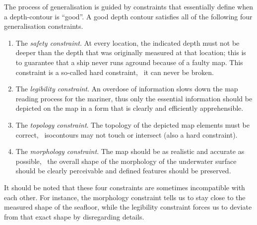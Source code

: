 The process of generalisation is guided by constraints that essentially define when a depth-contour is ``good''.
A good depth contour satisfies all of the following four generalisation constraints.
\begin{enumerate}
  \item The \emph{safety constraint}.  
  At every location, the indicated depth must not be deeper than the depth that was originally measured at that location; this is to guarantee that a ship never runs aground because of a faulty map.
  This constraint is a so-called hard constraint, \ie\ it can never be broken.
  \item The \emph{legibility constraint}. 
  An overdose of information slows down the map reading process for the mariner, thus only the essential information should be depicted on the map in a form that is clearly and efficiently apprehensible. %
  \item The \emph{topology constraint}. 
  The topology of the depicted map elements must be correct, \ie\ isocontours may not touch or intersect (also a hard constraint).
  \item The \emph{morphology constraint}. 
  The map should be as realistic and accurate as possible, \ie\ the overall shape of the morphology of the underwater surface should be clearly perceivable and defined features should be preserved.
\end{enumerate}

It should be noted that these four constraints are sometimes incompatible with each other. 
For instance, the morphology constraint tells us to stay close to the measured shape of the seafloor, while the legibility constraint forces us to deviate from that exact shape by disregarding details. 

%

